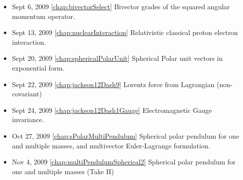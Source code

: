 \begin{itemize}
\item Sept 6, 2009 \ref{chap:bivectorSelect} Bivector grades of the squared angular momentum operator.

\item Sept 13, 2009 \ref{chap:nuclearInteraction} Relativistic classical proton electron interaction.

\item Sept 20, 2009 \ref{chap:sphericalPolarUnit} Spherical Polar unit vectors in exponential form.

\item Sept 22, 2009 \ref{chap:jackson12Dash9} Lorentz force from Lagrangian (non-covariant)

\item Sept 24, 2009 \ref{chap:jackson12Dash1Gauge} Electromagnetic Gauge invariance.

\item Oct 27, 2009 \ref{chap:sPolarMultiPendulum} Spherical polar pendulum for one and multiple masses, and multivector Euler-Lagrange formulation.

\item Nov 4, 2009 \ref{chap:multiPendulumSpherical2} Spherical polar pendulum for one and multiple masses (Take II)

\end{itemize}
